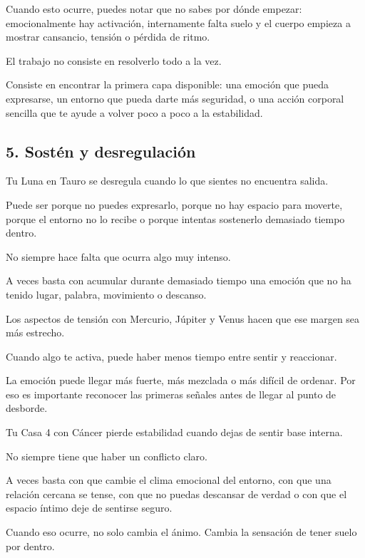 \documentclass[11pt,a4paper]{article}
\begin{document}
Cuando esto ocurre, puedes notar que no sabes por dónde empezar: emocionalmente hay activación, internamente falta suelo y el cuerpo empieza a mostrar cansancio, tensión o pérdida de ritmo.

El trabajo no consiste en resolverlo todo a la vez.

Consiste en encontrar la primera capa disponible: una emoción que pueda expresarse, un entorno que pueda darte más seguridad, o una acción corporal sencilla que te ayude a volver poco a poco a la estabilidad.

\vspace{0.8cm}

\subsection{5. Sostén y desregulación}

Tu Luna en Tauro se desregula cuando lo que sientes no encuentra salida.

Puede ser porque no puedes expresarlo, porque no hay espacio para moverte, porque el entorno no lo recibe o porque intentas sostenerlo demasiado tiempo dentro.

No siempre hace falta que ocurra algo muy intenso.

A veces basta con acumular durante demasiado tiempo una emoción que no ha tenido lugar, palabra, movimiento o descanso.

Los aspectos de tensión con Mercurio, Júpiter y Venus hacen que ese margen sea más estrecho.

Cuando algo te activa, puede haber menos tiempo entre sentir y reaccionar.

La emoción puede llegar más fuerte, más mezclada o más difícil de ordenar. Por eso es importante reconocer las primeras señales antes de llegar al punto de desborde.

Tu Casa 4 con Cáncer pierde estabilidad cuando dejas de sentir base interna.

No siempre tiene que haber un conflicto claro.

A veces basta con que cambie el clima emocional del entorno, con que una relación cercana se tense, con que no puedas descansar de verdad o con que el espacio íntimo deje de sentirse seguro.

Cuando eso ocurre, no solo cambia el ánimo. Cambia la sensación de tener suelo por dentro.
\end{document}
